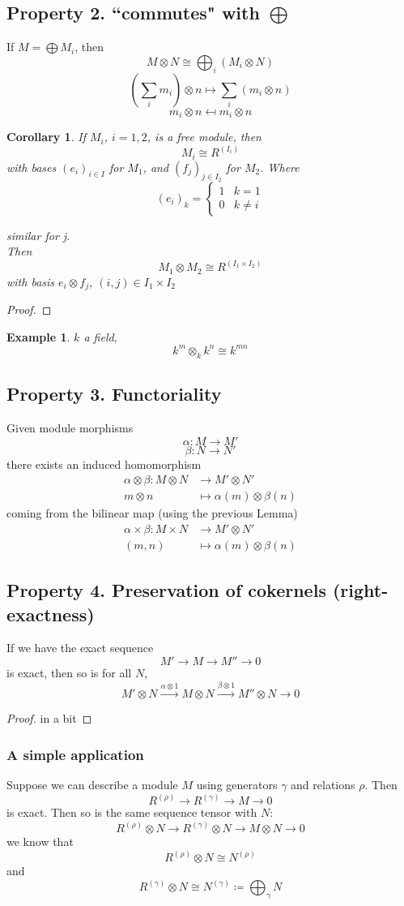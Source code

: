 \documentclass[12pt]{article}
\newcommand{\mapping}[5]{\begin{align*}
#1\colon #2 &\to #3\\
#4 & \mapsto #5
\end{align*}}
\newtheorem{corollary}[theorem]{Corollary}
\newtheorem*{eg}{Example}
\theoremstyle{definition}
\begin{document}
\subsection*{Property 2. \boldsymbol{\otimes}  ``commutes" with $\bigoplus$}
If $M = \bigoplus M_i$, then
\[
M \otimes N \cong \bigoplus_i(M_i \otimes N)
\]
\[
\left(\sum_i m_i\right)\otimes n \mapsto \sum_i\left(m_i \otimes n\right)
\]
\[
m_i \otimes n \mapsfrom m_i \otimes n
\]
\begin{corollary}
If $M_i$, $i=1,2$, is a free module, then
\[
M_i \cong R^{(I_i)}
\]
with bases $(e_i)_{i\in I}$ for $M_1$, and $(f_j)_{j\in I_2}$ for $M_2$. Where
\[
(e_i)_k=
\begin{cases}
1 & k=1\\
0 & k\neq i
\end{cases}
\]

similar for j.\\
Then
\[
M_1 \otimes M_2 \cong R^{(I_1\times I_2)}
\]
with basis $e_i \otimes f_j$, $(i,j) \in I_1\times I_2$
\end{corollary}
\begin{proof}

\end{proof}
\begin{eg}
$k$ a field, 
\[
k^m \otimes_k k^n \cong k^{mn} 
\]

\end{eg}
\subsection*{Property 3. Functoriality}
Given module morphisms
\[
\alpha: M \rightarrow M'
\]
\[
\beta: N \rightarrow N'
\]
there exists an induced homomorphism
\[
\mapping{\alpha \otimes \beta}{M \otimes N}{M' \otimes N'}{m \otimes n}{\alpha(m) \otimes \beta(n)}
\]
coming from the bilinear map (using the previous Lemma)
\[
\mapping{\alpha \times \beta}{M \times N}{M' \otimes N'}{(m,n)}{\alpha(m)\otimes \beta(n)}
\]
\subsection*{Property 4. Preservation of cokernels (right-exactness)}
If we have the exact sequence
\[
M' \rightarrow M \rightarrow M'' \rightarrow 0
\]
is exact, then so is for all $N$,
\[
M'\otimes N \xrightarrow{\alpha \otimes 1} M \otimes N \xrightarrow{\beta \otimes 1} M'' \otimes N \rightarrow 0
\]
\begin{proof}
in a bit
\end{proof}
\subsubsection*{A simple application}
Suppose we can describe a module $M$ using generators $\gamma$ and relations $\rho$. Then
\[
R^{(\rho)} \rightarrow R^{(\gamma)} \rightarrow M \rightarrow 0
\]
is exact. Then so is the same sequence tensor with $N$:
\[
R^{(\rho)} \otimes N \rightarrow R^{(\gamma)}\otimes N \rightarrow M \otimes N \rightarrow 0
\]
we know that
\[
R^{(\rho)} \otimes N \cong N^{(\rho)}
\]
and
\[
R^{(\gamma)}\otimes N \cong N^{(\gamma)} \coloneqq \bigoplus_\gamma N
\]
\end{document}
